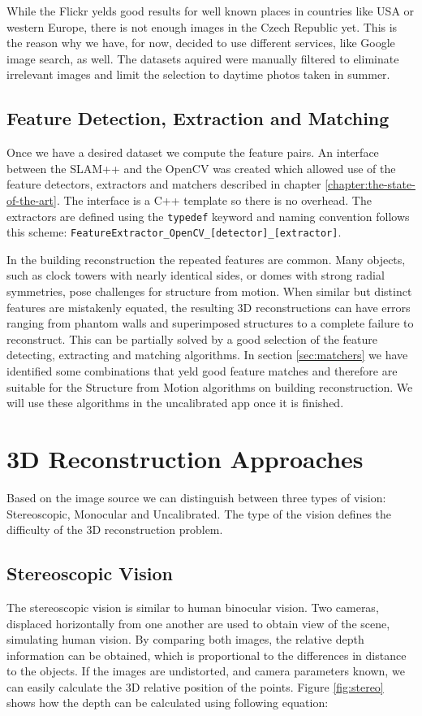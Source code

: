 While the Flickr yelds good results for well known places in countries like USA or western Europe, there is not enough images in the Czech Republic yet. This is the reason why we have, for now, decided to use different services, like Google image search, as well. The datasets aquired were manually filtered to eliminate irrelevant images and limit the selection to daytime photos taken in summer.

\subsection*{Feature Detection, Extraction and Matching}
Once we have a desired dataset we compute the feature pairs. An interface between the SLAM++ and the OpenCV was created which allowed use of the feature detectors, extractors and matchers described in chapter \ref{chapter:the-state-of-the-art}. The interface is a C++ template so there is no overhead. The extractors are defined using the \texttt{typedef} keyword and naming convention follows this scheme: \texttt{FeatureExtractor\_OpenCV\_[detector]\_[extractor]}.

In the building reconstruction the repeated features are common. Many objects, such as clock towers with nearly identical sides, or domes with strong radial symmetries, pose challenges for structure from motion. When similar but distinct features are mistakenly equated, the resulting 3D reconstructions can have errors ranging from phantom walls and superimposed structures to a complete failure to reconstruct. This can be partially solved by a good selection of the feature detecting, extracting and matching algorithms. In section \ref{sec:matchers} we have identified some combinations that yeld good feature matches and therefore are suitable for the Structure from Motion algorithms on building reconstruction. We will use these algorithms in the uncalibrated app once it is finished.

\section{3D Reconstruction Approaches}
Based on the image source we can distinguish between three types of vision: Stereoscopic, Monocular and Uncalibrated. The type of the vision defines the difficulty of the 3D reconstruction problem. \cite{book:multiple_view_geometry}

\subsection*{Stereoscopic Vision}
The stereoscopic vision is similar to human binocular vision. Two cameras, displaced horizontally from one another are used to obtain view of the scene, simulating human vision. By comparing both images, the relative depth information can be obtained, which is proportional to the differences in distance to the objects. If the images are undistorted, and camera parameters known, we can easily calculate the 3D relative position of the points. Figure \ref{fig:stereo} shows how the depth can be calculated using following equation:


